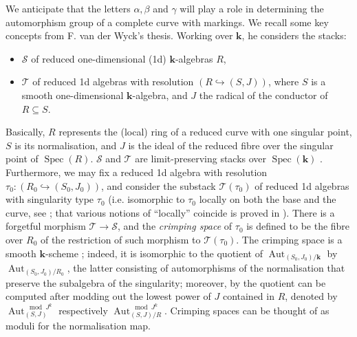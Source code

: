 \documentclass{compositio}
\renewcommand{\k}{\mathbf k}
\renewcommand{\to}{\rightarrow}
\newcommand{\Aut}{\operatorname{Aut}}
\theoremstyle{plain}
\theoremstyle{definition}
\theoremstyle{remark}
\begin{document}
We anticipate that the letters $\alpha,\beta$ and $\gamma$ will play a role in determining the automorphism group of a complete curve with markings. We recall some key concepts from F. van der Wyck's thesis.
Working over $\k$, he considers the stacks:
\begin{itemize}[leftmargin=.5cm]
 \item $\mathcal S$ of reduced one-dimensional (1d) $\k$-algebras $R$,
 \item $\mathcal T$ of reduced 1d algebras with resolution $(R\hookrightarrow (S,J))$, where $S$ is a smooth one-dimensional $\k$-algebra, and $J$ the radical of the conductor of $R\subseteq S$.
\end{itemize}
  Basically, $R$ represents the (local) ring of a reduced curve with one singular point, $S$ is its normalisation, and $J$ is the ideal of the reduced fibre over the singular point of $\operatorname{Spec}(R)$. $\mathcal S$ and $\mathcal T$ are limit-preserving stacks over $\operatorname{Spec}(\k)$ \cite[Proposition 1.21]{vdW}. Furthermore, we may fix a reduced 1d algebra with resolution $\tau_0:(R_0\hookrightarrow(S_0,J_0))$, and consider the substack $\mathcal T(\tau_0)$ of reduced 1d algebras with singularity type $\tau_0$ (i.e. isomorphic to $\tau_0$ locally on both the base and the curve, see \cite[Definition 1.64]{vdW}; that various notions of ``locally'' coincide is proved in \cite[Proposition 1.50]{vdW}). There is a forgetful morphism $\mathcal T\to\mathcal S$, and the \emph{crimping space} of $\tau_0$ is defined to be the fibre over $R_0$ of the restriction of such morphism to $\mathcal T(\tau_0)$. The crimping space is a smooth $\k$-scheme \cite[Theorems 1.70 and 1.73]{vdW}; indeed, it is isomorphic to the quotient of $\Aut_{(S_0,J_0)/\k}$ by $\Aut_{(S_0,J_0)/R_0}$, the latter consisting of automorphisms of the normalisation that preserve the subalgebra of the singularity; moreover, by \cite[Theorem 1.53]{vdW} the quotient can be computed after modding out the lowest power of $J$ contained in $R$, denoted by $\Aut_{(S,J)}^{\mod J^k}$ respectively $\Aut_{(S,J)/R}^{\mod J^k}$. Crimping spaces can be thought of as moduli for the normalisation map.
  
\end{document}
